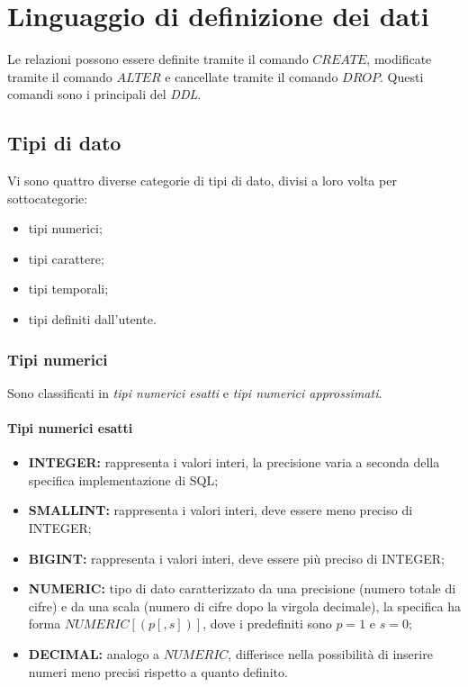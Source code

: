 \section{Linguaggio di definizione dei dati}%
\label{sec:Linguaggio di definizione dei dati}
Le relazioni possono essere definite tramite il comando $CREATE$, modificate
tramite il comando $ALTER$ e cancellate tramite il comando $DROP$.
Questi comandi sono i principali del \emph{DDL}.

\subsection{Tipi di dato}%
\label{sub:Tipi di dato}
Vi sono quattro diverse categorie di tipi di dato, divisi a loro volta per
sottocategorie:
\begin{itemize}
  \item tipi numerici;
  \item tipi carattere;
  \item tipi temporali;
  \item tipi definiti dall'utente.
\end{itemize}

\subsubsection{Tipi numerici}%
\label{ssub:Tipi numerici}
Sono classificati in \textit{tipi numerici esatti} e \textit{tipi numerici
approssimati}.

\paragraph{Tipi numerici esatti}%
\label{par:Tipi numerici esatti}
\begin{itemize}
  \item \textbf{INTEGER:} rappresenta i valori interi, la precisione varia a
    seconda della specifica implementazione di SQL;
  \item \textbf{SMALLINT:} rappresenta i valori interi, deve essere meno preciso
    di INTEGER;
  \item \textbf{BIGINT:} rappresenta i valori interi, deve essere più preciso di
    INTEGER;
  \item \textbf{NUMERIC:} tipo di dato caratterizzato da una precisione (numero
    totale di cifre) e da una scala (numero di cifre dopo la virgola decimale),
    la specifica ha forma $NUMERIC[(p[,s])]$, dove i predefiniti sono $p=1$ e
    $s=0$;
  \item \textbf{DECIMAL:} analogo a $NUMERIC$, differisce nella possibilità di
    inserire numeri meno precisi rispetto a quanto definito.
\end{itemize}

